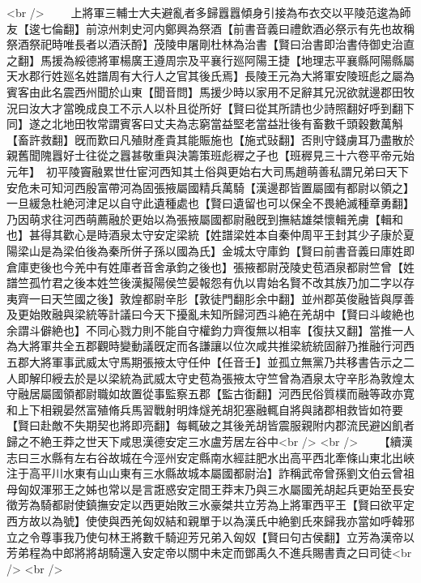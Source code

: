 <br />
　　上將軍三輔士大夫避亂者多歸囂囂傾身引接為布衣交以平陵范逡為師友【逡七倫翻】前涼州刺史河内鄭興為祭酒【前書音義曰禮飲酒必祭示有先也故稱祭酒祭祀時唯長者以酒沃酹】茂陵申屠剛杜林為治書【賢曰治書即治書侍御史治直之翻】馬援為綏德將軍楊廣王遵周宗及平襄行廵阿陽王捷【地理志平襄縣阿陽縣屬天水郡行姓廵名姓譜周有大行人之官其後氏焉】長陵王元為大將軍安陵班彪之屬為賓客由此名震西州聞於山東【聞音問】馬援少時以家用不足辭其兄況欲就邊郡田牧況曰汝大才當晚成良工不示人以朴且從所好【賢曰從其所請也少詩照翻好呼到翻下同】遂之北地田牧常謂賓客曰丈夫為志窮當益堅老當益壯後有畜數千頭穀數萬斛【畜許救翻】旣而歎曰凡殖財產貴其能賑施也【施式䜴翻】否則守錢虜耳乃盡散於親舊聞隗囂好士往從之囂甚敬重與決籌策班彪稺之子也【班稺見三十六卷平帝元始元年】　初平陵竇融累世仕宦河西知其土俗與更始右大司馬趙萌善私謂兄弟曰天下安危未可知河西殷富帶河為固張掖屬國精兵萬騎【漢邊郡皆置屬國有都尉以領之】一旦緩急杜絶河津足以自守此遺種處也【賢曰遺留也可以保全不畏絶滅種章勇翻】乃因萌求往河西萌薦融於更始以為張掖屬國都尉融旣到撫結雄桀懷輯羌虜【輯和也】甚得其歡心是時酒泉太守安定梁統【姓譜梁姓本自秦仲周平王封其少子康於夏陽梁山是為梁伯後為秦所併子孫以國為氏】金城太守庫鈞【賢曰前書音義曰庫姓即倉庫吏後也今羌中有姓庫者音舍承鈞之後也】張掖都尉茂陵史苞酒泉都尉竺曾【姓譜竺孤竹君之後本姓竺後漢擬陽侯竺晏報怨有仇以胄始名賢不改其族乃加二字以存夷齊一曰天竺國之後】敦煌都尉辛肜【敦徒門翻肜余中翻】並州郡英俊融皆與厚善及更始敗融與梁統等計議曰今天下擾亂未知所歸河西斗絶在羌胡中【賢曰斗峻絶也余謂斗僻絶也】不同心戮力則不能自守權鈞力齊復無以相率【復扶又翻】當推一人為大將軍共全五郡觀時變動議旣定而各謙讓以位次咸共推梁統統固辭乃推融行河西五郡大將軍事武威太守馬期張掖太守任仲【任音壬】並孤立無黨乃共移書告示之二人即解印綬去於是以梁統為武威太守史苞為張掖太守竺曾為酒泉太守辛肜為敦煌太守融居屬國領都尉職如故置從事監察五郡【監古衘翻】河西民俗質樸而融等政亦寛和上下相親晏然富殖脩兵馬習戰射明烽燧羌胡犯塞融輒自將與諸郡相救皆如符要【賢曰赴敵不失期契也將即亮翻】每輒破之其後羌胡皆震服親附内郡流民避凶飢者歸之不絶王莽之世天下咸思漢德安定三水盧芳居左谷中<br />
<br />
　　【續漢志曰三水縣有左右谷故城在今涇州安定縣南水經註肥水出高平西北牽條山東北出峽注于高平川水東有山山東有三水縣故城本屬國都尉治】詐稱武帝曾孫劉文伯云曾祖母匈奴渾邪王之姊也常以是言誑惑安定間王莽末乃與三水屬國羌胡起兵更始至長安徵芳為騎都尉使鎮撫安定以西更始敗三水豪桀共立芳為上將軍西平王【賢曰欲平定西方故以為號】使使與西羌匈奴結和親單于以為漢氏中絶劉氏來歸我亦當如呼韓邪立之令尊事我乃使句林王將數千騎迎芳兄弟入匈奴【賢曰句古侯翻】立芳為漢帝以芳弟程為中郎將將胡騎還入安定帝以關中未定而鄧禹久不進兵賜書責之曰司徒<br />
<br />
